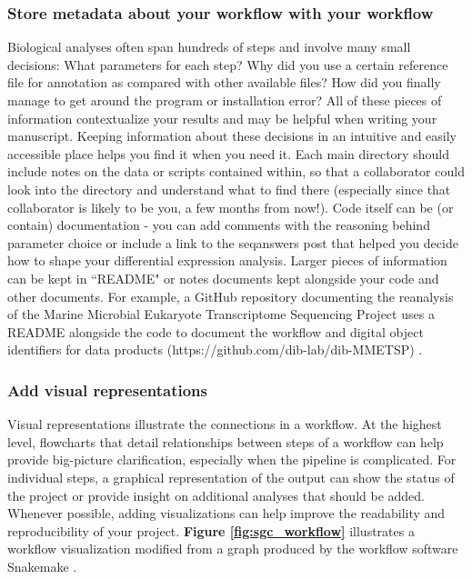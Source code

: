\documentclass[10pt,letterpaper]{article}
\begin{document}
\subsubsection*{Store metadata about your workflow with your workflow} 
Biological analyses often span hundreds of steps and involve many small decisions: What parameters for each step? 
Why did you use a certain reference file for annotation as compared with other available files? 
How did you finally manage to get around the program or installation error? 
All of these pieces of information contextualize your results and may be helpful when writing your manuscript. 
Keeping information about these decisions in an intuitive and easily accessible place helps you find it when you need it. 
Each main directory should include notes on the data or scripts contained within, so that a collaborator could look into the directory and understand what to find there (especially since that collaborator is likely to be you, a few months from now!).
Code itself can be (or contain) documentation - you can add comments with the reasoning behind parameter choice or include a link to the seqanswers post that helped you decide how to shape your differential expression analysis. 
Larger pieces of information can be kept in ``README" or notes documents kept alongside your code and other documents. 
For example, a GitHub repository documenting the reanalysis of the Marine Microbial Eukaryote Transcriptome Sequencing Project uses a README alongside the code to document the workflow and digital object identifiers for data products (https://github.com/dib-lab/dib-MMETSP) \cite{johnson2019}.   

\subsubsection*{Add visual representations} 
Visual representations illustrate the connections in a workflow. 
At the highest level, flowcharts that detail relationships between steps of a workflow can help provide big-picture clarification, especially when the pipeline is complicated. 
For individual steps, a graphical representation of the output can show the status of the project or provide insight on additional analyses that should be added. 
Whenever possible, adding visualizations can help improve the readability and reproducibility of your project. \textbf{Figure \ref{fig:sgc_workflow}} illustrates a workflow visualization modified from a graph produced by the workflow software Snakemake \cite{brown2019exploring}. 
\end{document}
